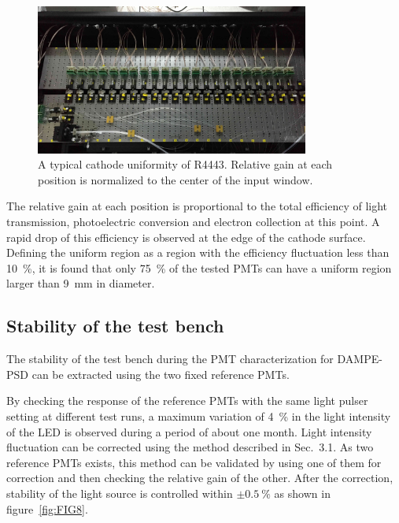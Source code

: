 \documentclass{JINST}
\begin{document}
\begin{figure}[tbp]
	\centering
	\includegraphics[width=90mm]{FIG7}
	\caption{A typical cathode uniformity of R4443.
			Relative gain at each position is normalized to the center of the input window.}
	\label{fig:FIG7}
\end{figure} 
	
The relative gain at each position is proportional to the total efficiency of light transmission, photoelectric conversion and electron collection at this point.
A rapid drop of this efficiency is observed at the edge of the cathode surface. 
Defining the uniform region as a region with the efficiency fluctuation less than \SI{10}{\percent}, it is found that only \SI{75}{\percent} of the tested PMTs can have a uniform region larger than \SI{9}{\milli\meter} in diameter. 
	
	
\subsection{Stability of the test bench}
\label{sec:stability}
	
The stability of the test bench during the PMT characterization for DAMPE-PSD can be extracted using the two fixed reference PMTs.

By checking the response of the reference PMTs with the same light pulser setting at different test runs, a maximum variation of \SI{4}{\percent} in the light intensity of the LED is observed during a period of about one month.
Light intensity fluctuation can be corrected using the method described in Sec.~3.1.
As two reference PMTs exists, this method can be validated by using one of them for correction and then checking the relative gain of the other. 
After the correction, stability of the light source is controlled within $\pm\SI{0.5}{\percent}$ as shown in figure~\ref{fig:FIG8}.
	
\end{document}
